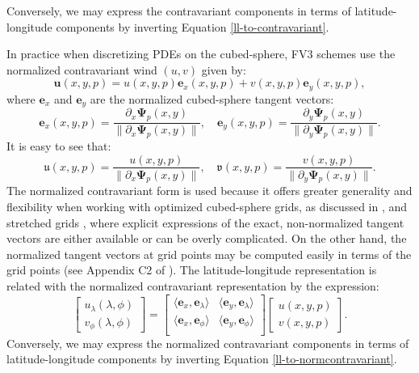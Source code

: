 Conversely, we may express the contravariant components in terms of
latitude-longitude components by inverting Equation \eqref{ll-to-contravariant}.

In practice when discretizing PDEs on the cubed-sphere, FV3 schemes use the normalized contravariant wind
$({u},{v})$ given by:
\begin{equation}
	\label{norm-contravariant-wind}
	\boldsymbol{u}(x, y, p) = 
	{u}(x, y, p) \boldsymbol{e}_x(x, y,p) + 
	{v}(x, y, p) \boldsymbol{e}_y(x, y,p),
\end{equation}
where $\boldsymbol{e}_x$ and $\boldsymbol{e}_y$ are the normalized cubed-sphere tangent vectors:
\begin{equation}
   \boldsymbol{e}_x(x,y,p)  = \frac{\partial_x\boldsymbol{\Psi}_p(x,y)}{\|\partial_x\boldsymbol{\Psi}_p(x,y)\|}, \quad
   \boldsymbol{e}_y(x,y,p)  = \frac{\partial_y\boldsymbol{\Psi}_p(x,y)}{\|\partial_y\boldsymbol{\Psi}_p(x,y)\|}.
\end{equation}
It is easy to see that:
\begin{equation}
	\label{contra-uv}
	\mathfrak{u}(x,y,p)  = \frac{{u}(x,y,p)}{\|\partial_x\boldsymbol{\Psi}_p(x,y)\|}, \quad
	\mathfrak{v}(x,y,p)  = \frac{{v}(x,y,p)}{\|\partial_y\boldsymbol{\Psi}_p(x,y)\|}.
\end{equation}
The normalized contravariant form is used because it offers greater generality and flexibility when working with optimized cubed-sphere grids,
as discussed in \citet{putman:2007}, and stretched grids \citep{harris:2016}, 
where explicit expressions of the exact, non-normalized tangent vectors are either available or can be overly complicated.
On the other hand, the normalized tangent vectors at grid points may be computed easily in terms of the grid points (see Appendix C2 of \citet{chen:2021}).
The latitude-longitude representation is related with the normalized contravariant representation by the expression:
\begin{equation}
	\label{ll-to-normcontravariant}
	\begin{bmatrix}
		u_\lambda (\lambda, \phi) \\
		v_\phi (\lambda, \phi) 
	\end{bmatrix}
	=
	\begin{bmatrix}
		\langle 	\boldsymbol{e}_x, \boldsymbol{e}_\lambda \rangle 
		& \langle 	\boldsymbol{e}_y, \boldsymbol{e}_\lambda \rangle \\
		\langle 	\boldsymbol{e}_x, \boldsymbol{e}_\phi \rangle 
		& \langle 	\boldsymbol{e}_y, \boldsymbol{e}_\phi \rangle \\
	\end{bmatrix}
	\begin{bmatrix}
		{u}(x,y,p) \\
		{v}(x,y,p)
	\end{bmatrix}.
\end{equation}
Conversely, we may express the normalized contravariant components in terms of
latitude-longitude components by inverting Equation \eqref{ll-to-normcontravariant}.


